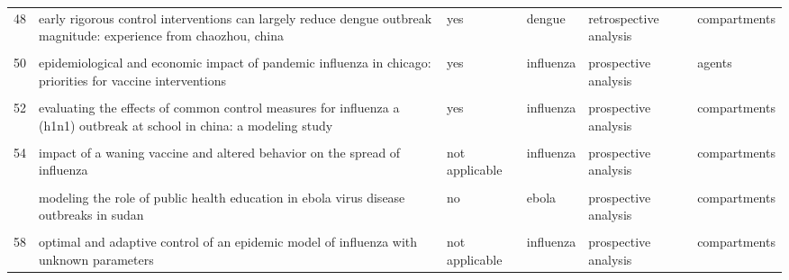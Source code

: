 \documentclass[
]{article}
\begin{document}
\begin{landscape}
\begin{longtable}{l>{\raggedright\arraybackslash}p{3.3cm}l>{\raggedright\arraybackslash}p{3.3cm}>{\raggedright\arraybackslash}p{2cm}l}
48 & early rigorous control interventions can largely reduce dengue outbreak magnitude: experience from chaozhou, china & yes & dengue & retrospective analysis & compartments\\
\cellcolor{gray!6}{49} & \cellcolor{gray!6}{effects of reactive social distancing on the 1918 influenza pandemic} & \cellcolor{gray!6}{no} & \cellcolor{gray!6}{influenza} & \cellcolor{gray!6}{retrospective analysis} & \cellcolor{gray!6}{compartments}\\
50 & epidemiological and economic impact of pandemic influenza in chicago: priorities for vaccine interventions & yes & influenza & prospective analysis & agents\\
\addlinespace
\cellcolor{gray!6}{51} & \cellcolor{gray!6}{estimating direct and indirect protective effect of influenza vaccination in the united states} & \cellcolor{gray!6}{yes} & \cellcolor{gray!6}{influenza} & \cellcolor{gray!6}{retrospective analysis} & \cellcolor{gray!6}{compartments}\\
52 & evaluating the effects of common control measures for influenza a (h1n1) outbreak at school in china: a modeling study & yes & influenza & prospective analysis & compartments\\
\cellcolor{gray!6}{53} & \cellcolor{gray!6}{evaluation of strategies to control a potential outbreak of foot-and-mouth disease in sweden} & \cellcolor{gray!6}{yes} & \cellcolor{gray!6}{fmd} & \cellcolor{gray!6}{prospective analysis} & \cellcolor{gray!6}{agents}\\
54 & impact of a waning vaccine and altered behavior on the spread of influenza & not applicable & influenza & prospective analysis & compartments\\
\cellcolor{gray!6}{55} & \cellcolor{gray!6}{mathematical models for devising the optimal ebola virus disease eradication} & \cellcolor{gray!6}{no} & \cellcolor{gray!6}{ebola} & \cellcolor{gray!6}{prospective analysis} & \cellcolor{gray!6}{compartments}\\
\addlinespace
56 & modeling the role of public health education in ebola virus disease outbreaks in sudan & no & ebola & prospective analysis & compartments\\
\cellcolor{gray!6}{57} & \cellcolor{gray!6}{modelling the transmission and control strategies of varicella among school children in shenzhen, china} & \cellcolor{gray!6}{yes} & \cellcolor{gray!6}{varicella} & \cellcolor{gray!6}{prospective analysis} & \cellcolor{gray!6}{compartments}\\
58 & optimal and adaptive control of an epidemic model of influenza with unknown parameters & not applicable & influenza & prospective analysis & compartments\\

\end{longtable}
\end{landscape}
\end{document}
